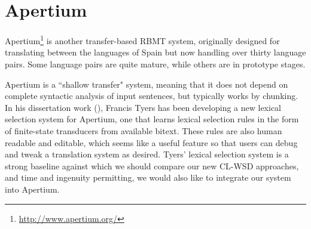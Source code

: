 \section{Apertium}
Apertium\footnote{\url{http://www.apertium.org/}} \cite{Forcada_theapertium} is
another transfer-based RBMT system, originally designed for translating between
the languages of Spain but now handling over thirty language pairs. Some
language pairs are quite mature, while others are in prototype stages.

Apertium is a ``shallow transfer" system, meaning that it does not depend on
complete syntactic analysis of input sentences, but typically works by
chunking.
In his dissertation work (\cite{tyers-fst,tyers-thesis}), Francis Tyers has
been developing a new lexical selection system for Apertium, one that learns
lexical selection rules in the form of finite-state transducers from available
bitext. These rules are also human readable and editable, which seems like a
useful feature so that users can debug and tweak a translation system as
desired.
Tyers' lexical selection system is a strong baseline against which we should
compare our new CL-WSD approaches, and time and ingenuity permitting, we would
also like to integrate our system into Apertium.
